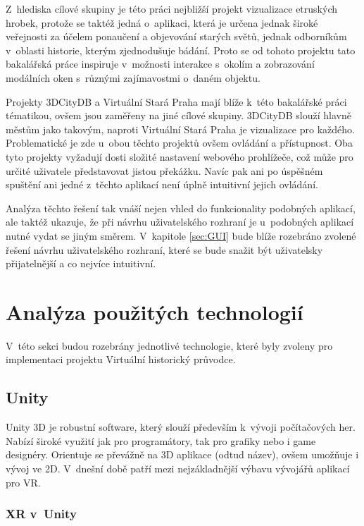 \documentclass[thesis=B,czech]{FITthesis}[2012/06/26]
\begin{document}
  Z~hlediska cílové skupiny je této práci nejbližší projekt vizualizace etruských hrobek, protože se taktéž jedná o~aplikaci, která je určena jednak široké veřejnosti za účelem ponaučení a objevování starých světů, jednak odborníkům v~oblasti historie, kterým zjednodušuje bádání. Proto se od tohoto projektu tato bakalářská práce inspiruje v~možnosti interakce s~okolím a zobrazování modálních oken s~různými zajímavostmi o~daném objektu.

 Projekty 3DCityDB a Virtuální Stará Praha mají blíže k~této bakalářské práci tématikou, ovšem jsou zaměřeny na jiné cílové skupiny. 3DCityDB slouží hlavně městům jako takovým, naproti Virtuální Stará Praha je vizualizace pro každého. Problematické je zde u~obou těchto projektů ovšem ovládání a přístupnost. Oba tyto projekty vyžadují dosti složité nastavení webového prohlížeče, což může pro určité uživatele představovat jistou překážku. Navíc pak ani po úspěšném spuštění ani jedné z~těchto aplikací není úplně intuitivní jejich ovládání. 
 
 Analýza těchto řešení tak vnáší nejen vhled do funkcionality podobných aplikací, ale taktéž ukazuje, že při návrhu uživatelského rozhraní je u~podobných aplikací nutné vydat se jiným směrem. V~kapitole \ref{sec:GUI} bude blíže rozebráno zvolené řešení návrhu uživatelského rozhraní, které se bude snažit být uživatelsky přijatelnější a co nejvíce intuitivní.
	
	\section{Analýza použitých technologií}
	
	V~této sekci budou rozebrány jednotlivé technologie, které byly zvoleny pro implementaci projektu Virtuální historický průvodce.

		\subsection{Unity}	
		
		Unity 3D je robustní software, který slouží především k~vývoji počítačových her. Nabízí široké využití jak pro programátory, tak pro grafiky nebo i game designéry. Orientuje se převážně na 3D aplikace (odtud název), ovšem umožňuje i vývoj ve 2D. V~dnešní době patří mezi nejzákladnější výbavu vývojářů aplikací pro VR.
		
		\subsubsection{XR v~Unity}
		
\end{document}
